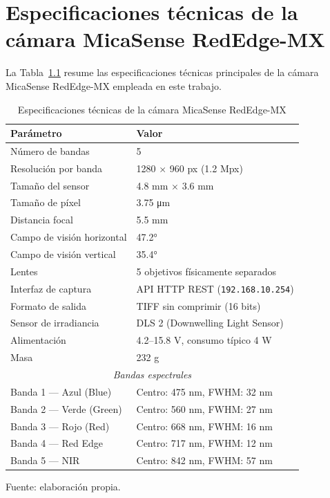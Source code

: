
\chapter{Especificaciones técnicas de la cámara MicaSense RedEdge-MX}
\label{anx:camara}

La Tabla~\ref{tab:specs_camara} resume las especificaciones técnicas
principales de la cámara MicaSense RedEdge-MX empleada en este trabajo.

\begin{table}[H]
\centering
\caption{Especificaciones técnicas de la cámara MicaSense RedEdge-MX}
\label{tab:specs_camara}
\begin{tabular}{ll}
\toprule
\textbf{Parámetro}              & \textbf{Valor} \\
\midrule
Número de bandas                & 5 \\
Resolución por banda            & 1280 $\times$ 960 px (1.2 Mpx) \\
Tamaño del sensor               & 4.8 mm $\times$ 3.6 mm \\
Tamaño de píxel                 & 3.75 \si{\micro m} \\
Distancia focal                 & 5.5 mm \\
Campo de visión horizontal      & 47.2° \\
Campo de visión vertical        & 35.4° \\
Lentes                          & 5 objetivos físicamente separados \\
Interfaz de captura             & API HTTP REST (\texttt{192.168.10.254}) \\
Formato de salida               & TIFF sin comprimir (16 bits) \\
Sensor de irradiancia           & DLS 2 (Downwelling Light Sensor) \\
Alimentación                    & 4.2--15.8 V, consumo típico 4 W \\
Masa                            & 232 g \\
\midrule
\multicolumn{2}{c}{\textit{Bandas espectrales}} \\
\midrule
Banda 1 — Azul (Blue)           & Centro: 475 nm, FWHM: 32 nm \\
Banda 2 — Verde (Green)         & Centro: 560 nm, FWHM: 27 nm \\
Banda 3 — Rojo (Red)            & Centro: 668 nm, FWHM: 16 nm \\
Banda 4 — Red Edge              & Centro: 717 nm, FWHM: 12 nm \\
Banda 5 — NIR                   & Centro: 842 nm, FWHM: 57 nm \\
\bottomrule
\end{tabular}

  {\footnotesize Fuente: elaboración propia.}
\end{table}

